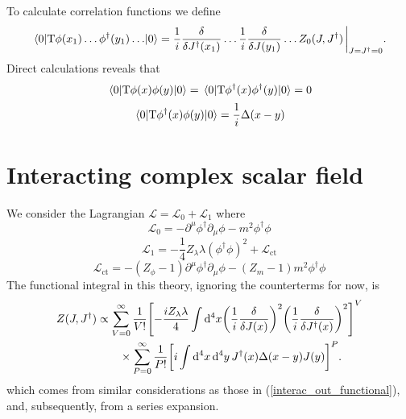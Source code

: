 To calculate correlation functions we define
 \begin{equation}
     \vev{\text{T}\phi(x_1)\dots\phi^\dagger(y_1)\dots}=\frac{1}{i}\fdv{J^\dagger(x_1)}\dots\frac{1}{i}\fdv{J(y_1)}\dots Z_0(J,J^\dagger)\eval_{J=J^\dagger=0}.
 \end{equation}
 Direct calculations reveals that
 \begin{equation}
     \vev{\text{T}\phi(x)\phi(y)}=\vev{\text{T}\phi^\dagger(x)\phi^\dagger(y)}=0
 \end{equation}
 \begin{equation}
     \vev{\text{T}\phi^\dagger(x)\phi(y)}=\frac{1}{i}\Delta(x-y)
 \end{equation}
 \section{Interacting complex scalar field}
 We consider the Lagrangian $\mathcal{L}=\mathcal{L}_0+\mathcal{L}_1$ where
 \begin{equation}
     \mathcal{L}_0=-\partial^{\mu} \phi^{\dagger} \partial_{\mu} \phi-{m}^{2} \phi^{\dagger} \phi
 \end{equation}
 \begin{equation}
     \mathcal{L}_1=-\frac{1}{4}Z_\lambda\lambda(\phi^\dagger\phi)^2+\mathcal{L}_{\text{ct}}
 \end{equation}
 \begin{equation}
     \mathcal{L}_{\text{ct}}=-(Z_\phi-1)\partial^{\mu}\phi^{\dagger}\partial_{\mu} \phi -(Z_m-1)m^2\phi^\dagger\phi
 \end{equation}
 The functional integral in this theory, ignoring the counterterms for now, is
\begin{equation}
\begin{aligned}
Z(J,J^\dagger)&\propto\sum_{V=0}^\infty\frac{1}{V!}\qty[-\frac{iZ_\lambda\lambda}{4}\int\dd^4x\qty(\frac{1}{i}\fdv{J(x)})^2\qty(\frac{1}{i}\fdv{J^\dagger(x)})^2]^V\\&\qquad\times\sum_{P=0}^\infty\frac{1}{P!}\qty[i\int\dd^4x\,\dd^4y\,J^\dagger(x)\Delta(x-y)J(y)]^P.
\end{aligned}
\end{equation}
which comes from similar considerations as those in (\ref{interac_out_functional}), and, subsequently, from a series expansion.\\

